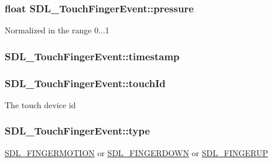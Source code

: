 \subsubsection[{\texorpdfstring{pressure}{pressure}}]{\setlength{\rightskip}{0pt plus 5cm}float S\+D\+L\+\_\+\+Touch\+Finger\+Event\+::pressure}\hypertarget{struct_s_d_l___touch_finger_event_ab4fca822d0807b5748dbae8d3cc56524}{}\label{struct_s_d_l___touch_finger_event_ab4fca822d0807b5748dbae8d3cc56524}
Normalized in the range 0...1 
\subsubsection[{\texorpdfstring{timestamp}{timestamp}}]{ S\+D\+L\+\_\+\+Touch\+Finger\+Event\+::timestamp}\hypertarget{struct_s_d_l___touch_finger_event_abde2ab5cb013bbd21e37a65e2f8fa666}{}\label{struct_s_d_l___touch_finger_event_abde2ab5cb013bbd21e37a65e2f8fa666}
\subsubsection[{\texorpdfstring{touch\+Id}{touchId}}]{ S\+D\+L\+\_\+\+Touch\+Finger\+Event\+::touch\+Id}\hypertarget{struct_s_d_l___touch_finger_event_ad7a6f39ec9af1bf47b160d18314edd70}{}\label{struct_s_d_l___touch_finger_event_ad7a6f39ec9af1bf47b160d18314edd70}
The touch device id 
\subsubsection[{\texorpdfstring{type}{type}}]{ S\+D\+L\+\_\+\+Touch\+Finger\+Event\+::type}\hypertarget{struct_s_d_l___touch_finger_event_a3883218fa3426065ca66086c100edbfa}{}\label{struct_s_d_l___touch_finger_event_a3883218fa3426065ca66086c100edbfa}
\hyperlink{_s_d_l__events_8h_a3b589e89be6b35c02e0dd34a55f3fccaa1862d7d009ade2c79b2f1fe4a30c9dd2}{S\+D\+L\+\_\+\+F\+I\+N\+G\+E\+R\+M\+O\+T\+I\+ON} or \hyperlink{_s_d_l__events_8h_a3b589e89be6b35c02e0dd34a55f3fccaaa712d1fa8bb69f6042e24a31e835a9ec}{S\+D\+L\+\_\+\+F\+I\+N\+G\+E\+R\+D\+O\+WN} or \hyperlink{_s_d_l__events_8h_a3b589e89be6b35c02e0dd34a55f3fccaa8266a108a628cc698c5172e72c1fc1e6}{S\+D\+L\+\_\+\+F\+I\+N\+G\+E\+R\+UP} 
